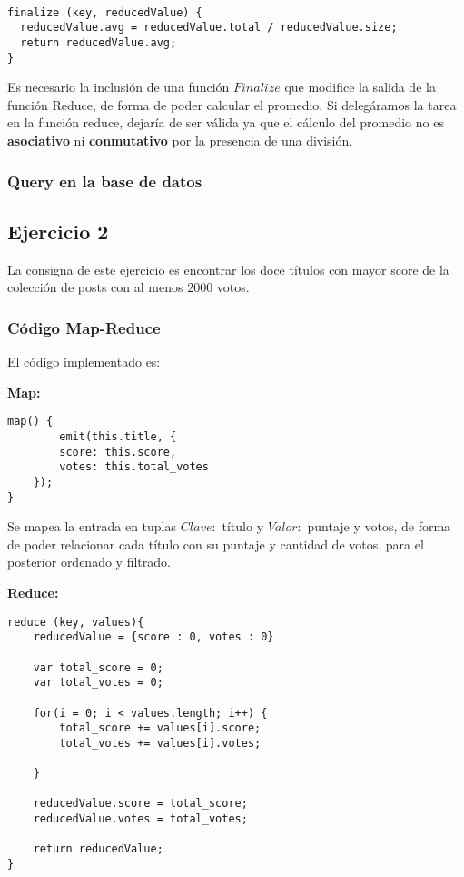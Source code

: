 \begin{lstlisting}

finalize (key, reducedValue) {
  reducedValue.avg = reducedValue.total / reducedValue.size;
  return reducedValue.avg;
}

\end{lstlisting}

Es necesario la inclusi\'on de una funci\'on $Finalize$ que modifice la salida de la funci\'on Reduce, de forma de poder calcular el promedio. Si deleg\'aramos la tarea en la funci\'on reduce, dejar\'ia de ser v\'alida ya que el c\'alculo del promedio no es \textbf{asociativo} ni \textbf{conmutativo} por la presencia de una divisi\'on.

\vspace{2mm}

\subsubsection{Query en la base de datos}


\subsection{Ejercicio 2}

La consigna de este ejercicio es encontrar los doce t\'itulos con mayor score de la colecci\'on de posts con al menos 2000 votos.

\subsubsection{C\'odigo Map-Reduce}

El c\'odigo implementado es:

\textbf{Map:}

\begin{lstlisting}
map() {
		emit(this.title, {
    	score: this.score,
    	votes: this.total_votes
    });
}
\end{lstlisting}

Se mapea la entrada en tuplas $Clave:$ t\'itulo y $Valor:$ puntaje y votos, de forma de poder relacionar cada t\'itulo con su puntaje y cantidad de votos, para el posterior ordenado y filtrado.

\vspace{2mm}

\textbf{Reduce:}

\begin{lstlisting}
reduce (key, values){
	reducedValue = {score : 0, votes : 0}
	
	var total_score = 0;
	var total_votes = 0;

	for(i = 0; i < values.length; i++) {
		total_score += values[i].score;
		total_votes += values[i].votes;

	}

	reducedValue.score = total_score;
	reducedValue.votes = total_votes;

    return reducedValue;
}

\end{lstlisting}

